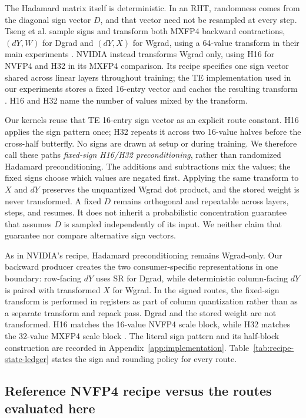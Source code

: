 The Hadamard matrix itself is deterministic. In an RHT, randomness comes from
the diagonal sign vector $D$, and that vector need not be resampled at every
step. Tseng et al. sample signs and transform both MXFP4 backward contractions,
$(dY,W)$ for Dgrad and $(dY,X)$ for Wgrad, using a 64-value transform in their
main experiments \cite{tseng2025mxfp4}. NVIDIA instead transforms Wgrad only,
using H16 for NVFP4 and H32 in its MXFP4 comparison. Its recipe specifies one
sign vector shared across linear layers throughout training; the TE
implementation used in our experiments stores a fixed 16-entry vector and caches the resulting
transform \cite{nvidia2025nvfp4,nvidia2026te}. H16 and H32 name the number of
values mixed by the transform.

Our kernels reuse that TE 16-entry sign vector as an explicit route
constant. H16 applies the sign pattern once; H32 repeats it across two 16-value halves
before the cross-half butterfly. No signs are drawn at setup or during
training. We therefore call these paths \emph{fixed-sign H16/H32
preconditioning}, rather than randomized Hadamard preconditioning. The
additions and subtractions mix the values; the fixed signs choose which values
are negated first. Applying the same transform to $X$ and $dY$ preserves the
unquantized Wgrad dot product, and the stored weight is never transformed. A
fixed $D$ remains orthogonal and repeatable across layers, steps, and resumes.
It does not inherit a probabilistic concentration guarantee that assumes $D$
is sampled independently of its input. We neither claim that guarantee nor
compare alternative sign vectors.

As in NVIDIA's recipe, Hadamard preconditioning remains Wgrad-only. Our
backward producer creates the two consumer-specific representations in one
boundary: row-facing $dY$ uses SR for Dgrad, while deterministic
column-facing $dY$ is paired with transformed $X$ for Wgrad. In the signed
routes, the fixed-sign transform is performed in registers as part of column
quantization rather than as a separate transform and repack pass. Dgrad and
the stored weight are not transformed. H16 matches the 16-value NVFP4 scale
block, while H32 matches the 32-value MXFP4 scale block
\cite{cim2026nativemxfp4}. The literal sign pattern and its half-block construction are recorded in
Appendix~\ref{app:implementation}. Table~\ref{tab:recipe-state-ledger} states
the sign and rounding policy for every route.

\subsection{Reference NVFP4 recipe versus the routes evaluated here}


